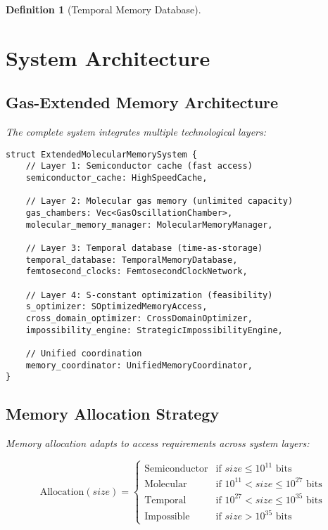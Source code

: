 \documentclass[12pt]{article}
\newtheorem{definition}[theorem]{Definition}
\begin{document}
\begin{definition}[Temporal Memory Database]
\section{System Architecture}

\subsection{Gas-Extended Memory Architecture}

The complete system integrates multiple technological layers:

\begin{lstlisting}[caption=Extended Memory System Architecture]
struct ExtendedMolecularMemorySystem {
    // Layer 1: Semiconductor cache (fast access)
    semiconductor_cache: HighSpeedCache,
    
    // Layer 2: Molecular gas memory (unlimited capacity)  
    gas_chambers: Vec<GasOscillationChamber>,
    molecular_memory_manager: MolecularMemoryManager,
    
    // Layer 3: Temporal database (time-as-storage)
    temporal_database: TemporalMemoryDatabase,
    femtosecond_clocks: FemtosecondClockNetwork,
    
    // Layer 4: S-constant optimization (feasibility)
    s_optimizer: SOptimizedMemoryAccess,
    cross_domain_optimizer: CrossDomainOptimizer,
    impossibility_engine: StrategicImpossibilityEngine,
    
    // Unified coordination
    memory_coordinator: UnifiedMemoryCoordinator,
}
\end{lstlisting}

\subsection{Memory Allocation Strategy}

Memory allocation adapts to access requirements across system layers:

\begin{equation}
\text{Allocation}(size) = \begin{cases}
\text{Semiconductor} & \text{if } size \leq 10^{11} \text{ bits} \\
\text{Molecular} & \text{if } 10^{11} < size \leq 10^{27} \text{ bits} \\
\text{Temporal} & \text{if } 10^{27} < size \leq 10^{35} \text{ bits} \\
\text{Impossible} & \text{if } size > 10^{35} \text{ bits}
\end{cases}
\end{equation}


\end{definition}
\end{document}
